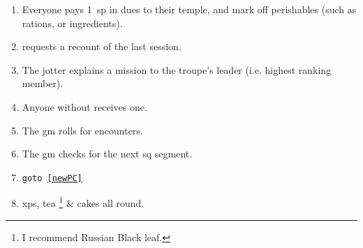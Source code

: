 
\begin{enumerate}
  \item
  Everyone pays 1~\gls{sp} in dues to their temple, and mark off perishables (such as rations, or \glspl{ingredient}).
  \item
   requests a recount of the last session.
  \item
  The \gls{jotter} explains a mission to the troupe's leader (i.e. highest ranking member).
  \item
  Anyone without  receives one.
  \label{newPC}
  \item
  The \gls{gm} rolls for encounters.
  \label{gmRollsEncounters}
  \item
  The \gls{gm} checks for the next \gls{sq} \gls{segment}.
  \item
  {\tt goto \ref{newPC}}
  \item
  \Glspl{xp}, tea%
  \ifodd\value{r3}\footnote{I recommend Russian Black leaf.}\fi
  \& cakes all round.
\end{enumerate}


